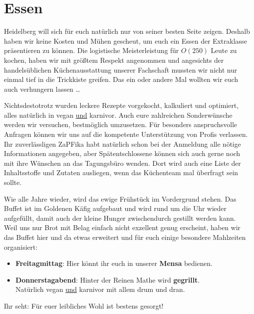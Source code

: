 
\section{Essen}
Heidelberg will sich für euch natürlich nur von seiner besten Seite zeigen. Deshalb haben wir keine Kosten und Mühen gescheut,  um euch ein Essen der Extraklasse präsentieren zu können. Die logistische Meisterleistung für $O(250)$ Leute zu kochen, haben wir mit größtem Respekt angenommen und angesichts der handelsüblichen Küchenausstattung unserer Fachschaft mussten wir nicht nur einmal tief in die Trickkiste greifen. Das ein oder andere Mal wollten wir euch auch verhungern lassen \dots

Nichtsdestotrotz wurden leckere Rezepte vorgekocht, kalkuliert und optimiert, alles natürlich in vegan \underline{und} karnivor.  Auch eure zahlreichen Sonderwünsche werden wir versuchen, bestmöglich umzusetzen. Für besonders anspruchsvolle Anfragen können wir uns auf die kompetente Unterstützung von Profis verlassen. Ihr zuverlässligen ZaPFika habt natürlich schon bei der Anmeldung alle nötige Informationen angegeben, aber Spätentschlossene können sich auch gerne noch mit ihre Wünschen an das Tagungsbüro wenden. Dort wird auch eine Liste der Inhaltsstoffe und Zutaten ausliegen, wenn das Küchenteam mal überfragt sein sollte.

Wie alle Jahre wieder, wird das ewige Frühstück im Vordergrund stehen. Das Buffet ist im Goldenen Käfig aufgebaut und wird rund um die Uhr wieder aufgefüllt, damit auch der kleine Hunger zwischendurch gestillt werden kann. Weil uns nur Brot mit Belag einfach nicht exzellent genug erscheint, haben wir das Buffet hier und da etwas erweitert und für euch einige besondere Mahlzeiten organisiert:
  \begin{itemize}
    \item \textbf{Freitagmittag}: Hier könnt ihr euch in unserer \textbf{Mensa} bedienen.
    \item \textbf{Donnerstagabend}: Hinter der Reinen Mathe wird \textbf{gegrillt}. \\
      Natürlich vegan \underline{und} karnivor mit allem drum und dran.
  \end{itemize}
  Ihr seht: Für euer leibliches Wohl ist bestens gesorgt! \\

